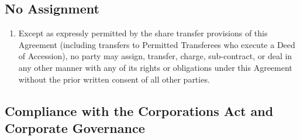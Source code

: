 \subsection{No Assignment}
\begin{enumerate}[label=(\alph*)]
\item Except as expressly permitted by the share transfer provisions of this Agreement (including transfers to Permitted Transferees who execute a Deed of Accession), no party may assign, transfer, charge, sub-contract, or deal in any other manner with any of its rights or obligations under this Agreement without the prior written consent of all other parties.
\end{enumerate}

\subsection{Compliance with the Corporations Act and Corporate Governance}

